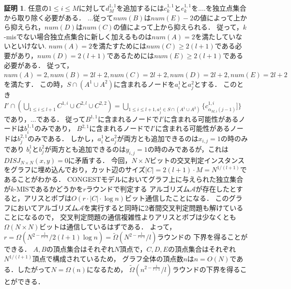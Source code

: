 \documentclass[12pt]{thesis}
\newcommand{\CONGEST}{\textsf{CONGEST}}
\theoremstyle{definition}
\newtheorem*{prf*}{証明}
\begin{document}
\begin{prf*}
任意の$1\leq i \leq M$に対して$d^{1,1}_{M}$を追加するには$c^{1,1}_{k}$と$e^{1,1}_{k}$を....を独立点集合から取り除く必要がある．
...従って$num(B)$は$num(E)-2$の値によって上から抑えられ，$num(D)$は$num(C)$の値によって上から抑えられる．
従って，$k$-misでない場合独立点集合に新しく加えるものは$num(A)=2$を満たしていないといけない.
$num(A)=2$を満たすためには$num(C)\geq 2(l+1)$である必要があり，$num(D)=2(l+1)$であるためには$num(E)\geq 2(l+1)$である必要がある．
従って，$num(A)=2,num(B)=2l+2,num(C)=2l+2,num(D)=2l+2,num(E)=2l+2$を満たす．
この時，$S\cap (A^{1}\cup A^{2})$に含まれるノードを$a^{1}_{i}$と$a^{2}_{j}$とする．
このとき$I'\cap(\bigcup_{1\leq i\leq l+1}C^{1,i}\cup C^{2,l} \cup C^{2,2})=\bigcup_{1\leq i \leq l+1, a^{1}_{j}\in S\cap (A^{1}\cup A^{2})}\{c^{1,i}_{\alpha_{M,i}(j-1)}]\}$
であり，...である．
従って$B^{1,1}$に含まれるノードで$I'$に含まれる可能性があるノードは$b^{1,1}_{i}$のみであり，
$B^{2,1}$に含まれるノードで$I'$に含まれる可能性があるノードは$b^{2,1}_{j}$のみである．
しかし，$a^{1}_{i}$と$a^{2}_{j}$が両方とも追加できるのは$x_{i,j}=1$の時のみであり
$b^{1}_{i}$と$b^{2}_{j}$が両方とも追加できるのは$y_{i,j}=1$の時のみであるが，これは$DISJ_{N\times N}(x,y)=0$に矛盾する．
今回，$N \times N$ビットの交叉判定インスタンスをグラフに埋め込んでおり，カット辺のサイズ$|C| = 2(l + 1) \cdot M = N^{1/(l + 1)}$であることがわかる．
{\CONGEST}モデルにおいてグラフ上に与えられた独立集合が$k$-MISであるかどうかを$r$ラウンドで判定する
アルゴリズム$\mathcal{A}$が存在したとすると，アリスとボブは$O(r \cdot |C| \cdot \log n)$ビット通信したことになる．
このグラフにおいてアルゴリズム$\mathcal{A}$を実行すると同時に2者間交叉判定問題も解けていることになるので，
交叉判定問題の通信複雑性よりアリスとボブは少なくとも$\Omega (N \times N)$ビットは通信しているはずである．
よって，$r = \Omega \left(N^{2 - \frac{1}{l + 1}} / 2( l + 1)\log n\right) = \tilde{\Omega}\left(N^{2 - \frac{1}{l + 1}}/l\right)$ラウンドの
下界を得ることができる．
$A, B$の頂点集合はそれぞれ$N$頂点で，$C, D, E$の頂点集合はそれぞれ$N^{1/(l + 1)}$頂点で構成されているため，
グラフ全体の頂点数$n$は$n = O(N)$である．したがって$N = \Omega(n)$になるため，
$\tilde{\Omega}\left(n^{2 - \frac{1}{l + 1}}/l\right)$ラウンドの下界を得ることができる．
\end{prf*}
\newpage
\end{document}
